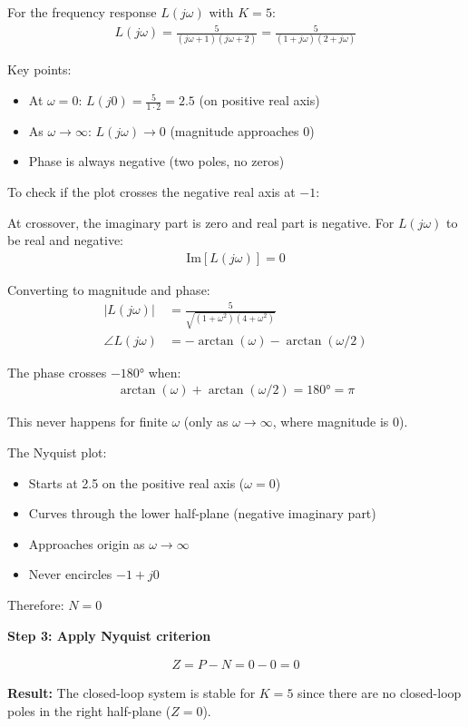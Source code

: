 \documentclass[11pt,a4paper]{article}
\begin{document}
For the frequency response $L(j\omega)$ with $K = 5$:
\begin{align}
  L(j\omega) = \frac{5}{(j\omega+1)(j\omega+2)} = \frac{5}{(1+j\omega)(2+j\omega)}
\end{align}

Key points:
\begin{itemize}
  \item At $\omega = 0$: $L(j0) = \frac{5}{1 \cdot 2} = 2.5$ (on positive real axis)
  \item As $\omega \to \infty$: $L(j\omega) \to 0$ (magnitude approaches 0)
  \item Phase is always negative (two poles, no zeros)
\end{itemize}

To check if the plot crosses the negative real axis at $-1$:

At crossover, the imaginary part is zero and real part is negative. For $L(j\omega)$ to be real and negative:
\begin{align}
  \text{Im}[L(j\omega)] = 0
\end{align}

Converting to magnitude and phase:
\begin{align}
  |L(j\omega)| &= \frac{5}{\sqrt{(1+\omega^2)(4+\omega^2)}} \\
  \angle L(j\omega) &= -\arctan(\omega) - \arctan(\omega/2)
\end{align}

The phase crosses $-180°$ when:
\begin{align}
  \arctan(\omega) + \arctan(\omega/2) = 180° = \pi
\end{align}

This never happens for finite $\omega$ (only as $\omega \to \infty$, where magnitude is 0).

The Nyquist plot:
\begin{itemize}
  \item Starts at 2.5 on the positive real axis ($\omega = 0$)
  \item Curves through the lower half-plane (negative imaginary part)
  \item Approaches origin as $\omega \to \infty$
  \item Never encircles $-1 + j0$
\end{itemize}

Therefore: $N = 0$

\textbf{Step 3: Apply Nyquist criterion}

\begin{align}
  Z = P - N = 0 - 0 = 0
\end{align}

\textbf{Result:} The closed-loop system is stable for $K = 5$ since there are no closed-loop poles in the right half-plane ($Z = 0$).
\end{document}
